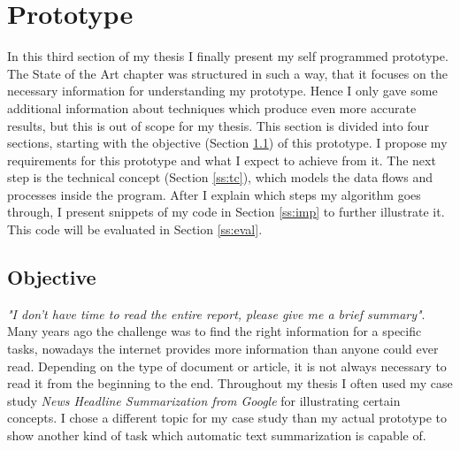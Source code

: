 \chapter{Prototype}\label{ch:proto}




%

In this third section of my thesis I finally present my self programmed prototype. The State of the Art chapter was structured in such a way, that it focuses on the necessary information for understanding my prototype. Hence I only gave some additional information about techniques which produce even more accurate results, but this is out of scope for my thesis. This section is divided into four sections, starting with the objective (Section \ref{ss:obj}) of this prototype. I propose my requirements for this prototype and what I expect to achieve from it. The next step is the technical concept (Section \ref{ss:tc}), which models the data flows and processes inside the program. After I explain which steps my algorithm goes through, I present snippets of my code in Section \ref{ss:imp} to further illustrate it. This code will be evaluated in Section \ref{ss:eval}.

\section{Objective}\label{ss:obj}

\textit{"I don't have time to read the entire report, please give me a brief summary"}. Many years ago the challenge was to find the right information for a specific tasks, nowadays the internet provides more information than anyone could ever read. Depending on the type of document or article, it is not always necessary to read it from the beginning to the end. Throughout my thesis I often used my case study \textit{News Headline Summarization from Google} for illustrating certain concepts. I chose a different topic for my case study than my actual prototype to show another kind of task which automatic text summarization is capable of.

